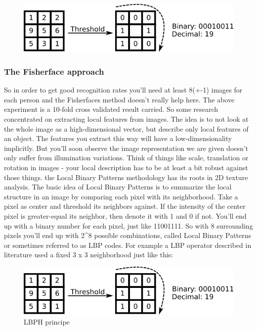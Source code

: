 \documentclass[a4paper,12pt]{report}
\begin{document}
				\begin{figure}[h]
					\centering
					\includegraphics{pic2.png}
				\end{figure}
			
				\subsubsection{The Fisherface approach}
				
				So in order to get good recognition rates you’ll need at least 8(+-1) images for each person and the Fisherfaces method doesn’t really help here. The above experiment is a 10-fold cross validated result carried.
				So some research concentrated on extracting local features from images. The idea is to not look at the whole image as a high-dimensional vector, but describe only local features of an object. The features you extract this way will have a low-dimensionality implicitly. But you’ll soon observe the image representation we are given doesn’t only suffer from illumination variations. Think of things like scale, translation or rotation in images - your local description has to be at least a bit robust against those things. the Local Binary Patterns methodology has its roots in 2D texture analysis. The basic idea of Local Binary Patterns is to summarize the local structure in an image by comparing each pixel with its neighborhood. Take a pixel as center and threshold its neighbors against. If the intensity of the center pixel is greater-equal its neighbor, then denote it with 1 and 0 if not. You’ll end up with a binary number for each pixel, just like 11001111. So with 8 surrounding pixels you’ll end up with 2^8 possible combinations, called Local Binary Patterns or sometimes referred to as LBP codes. For example a LBP operator described in literature used a fixed 3 x 3 neighborhood just like this:
				      
			      \begin{figure}[h]
				      \centering
				      \caption{\label{Face recognition} LBPH principe\cite{haar_lbp_hog_comp_pdf}}
				      \includegraphics[scale=0.55]{pic2.png}
			      \end{figure}
			      
\end{document}
